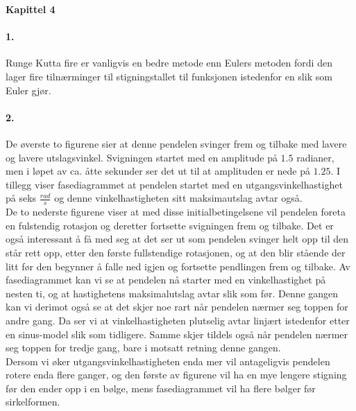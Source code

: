 \documentclass[11pt, A4paper,norsk]{article}
\begin{document}
	\begin{flushleft}
\textbf{Kapittel 4}
	\end{flushleft}
		\paragraph{1.}
			\begin{flushleft}
Runge Kutta fire er vanligvis en bedre metode enn Eulers metoden fordi den lager fire tilnærminger til stigningstallet til funksjonen istedenfor en slik som Euler gjør.
			\end{flushleft}
			









		\paragraph{2.}
			\begin{flushleft}
De øverste to figurene sier at denne pendelen svinger frem og tilbake med lavere og lavere utslagsvinkel. Svigningen startet med en amplitude på $1.5$ radianer, men i løpet av ca. åtte sekunder ser det ut til at amplituden er nede på $1.25$. I tillegg viser fasediagrammet at pendelen startet med en utgangsvinkelhastighet på seks $\frac{rad}{s}$ og denne vinkelhastigheten sitt maksimautslag avtar også. \\
De to nederste figurene viser at med disse initialbetingelsene vil pendelen foreta en fulstendig rotasjon og deretter fortsette svigningen frem og tilbake. Det er også interessant å få med seg at det ser ut som pendelen svinger helt opp til den står rett opp, etter den første fullstendige rotasjonen, og at den blir stående der litt før den begynner å falle ned igjen og fortsette pendlingen frem og tilbake. Av fasediagrammet kan vi se at pendelen nå starter med en vinkelhastighet på nesten ti, og at hastighetens maksimalutslag avtar slik som før. Denne gangen kan vi derimot også se at det skjer noe rart når pendelen nærmer seg toppen for andre gang. Da ser vi at vinkelhastigheten plutselig avtar linjært istedenfor etter en sinus-model slik som tidligere. Samme skjer tildels også når pendelen nærmer seg toppen for tredje gang, bare i motsatt retning denne gangen. \\
Dersom vi øker utgangsvinkelhastigheten enda mer vil antageligvis pendelen rotere enda flere ganger, og den første av figurene vil ha en mye lengere stigning før den ender opp i en bølge, mens fasediagrammet vil ha flere bølger før sirkelformen.
			\end{flushleft}
\end{document}
